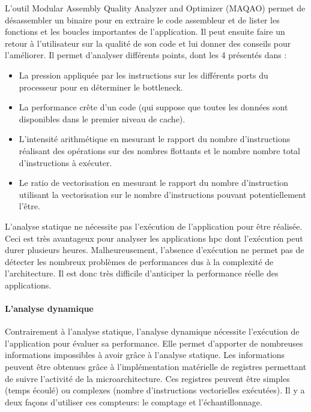             L’outil Modular Assembly Quality Analyzer and Optimizer (MAQAO) \cite{Djoudi2005} permet de désassembler un binaire pour en extraire le code assembleur et de lister les fonctions et les boucles importantes de l’application. Il peut ensuite faire un retour à l’utilisateur sur la qualité de son code et lui donner des conseils pour l’améliorer. Il permet d'analyser différents points, dont les 4 présentés dans \cite{popov:tel-01412638} :
            \begin{itemize}
                \item La pression appliquée par les instructions sur les différents ports du processeur pour en déterminer le bottleneck.
                \item La performance crête d'un code (qui suppose que toutes les données sont disponibles dans le premier niveau de cache).
                \item L’intensité arithmétique en mesurant le rapport du nombre d’instructions réalisant des opérations sur des nombres flottants et le nombre nombre total d’instructions à exécuter.
                \item Le ratio de vectorisation en mesurant le rapport du nombre d’instruction utilisant la vectorisation sur le nombre d’instructions pouvant potentiellement l’être.
            \end{itemize}
                      
            L'analyse statique ne nécessite pas l'exécution de l'application pour être réalisée. Ceci est très avantageux pour analyser les applications \gls{hpc} dont l'exécution peut durer plusieurs heures. Malheureusement, l'absence d'exécution ne permet pas de détecter les nombreux problèmes de performances dus à la complexité de l'architecture. Il est donc très difficile d'anticiper la performance réelle des applications. 
                 
        \paragraph{L'analyse dynamique}
            
            Contrairement à l'analyse statique, l'analyse dynamique nécessite l'exécution de l'application pour évaluer sa performance. Elle permet d’apporter de nombreuses informations impossibles à avoir grâce à l’analyse statique. Les informations peuvent être obtenues grâce à l'implémentation matérielle de registres permettant de suivre l'activité de la microarchitecture. Ces registres peuvent être simples (temps écoulé) ou complexes (nombre d'instructions vectorielles exécutées). Il y a deux façons d'utiliser ces compteurs: le comptage et l'échantillonnage.
               
